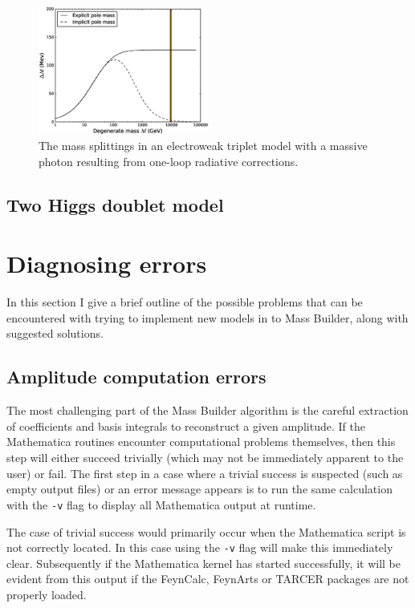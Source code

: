 \begin{figure}
\centering
\includegraphics[width=0.5\textwidth]{mass_splittings.eps}
\caption{The mass splittings in an electroweak triplet model with a massive photon resulting from one-loop radiative corrections.}\label{fig:1_loop}
\end{figure}



\subsection{Two Higgs doublet model}





\section{Diagnosing errors}\label{errors}

In this section I give a brief outline of the possible problems that can be encountered with trying to implement new models in to Mass Builder, along with suggested solutions.

\subsection{Amplitude computation errors}

The most challenging part of the Mass Builder algorithm is the careful extraction of coefficients and basis integrals to reconstruct a given amplitude.  If the Mathematica routines encounter computational problems themselves, then this step will either succeed trivially (which may not be immediately apparent to the user) or fail.  The first step in a case where a trivial success is suspected (such as empty output files) or an error message appears is to run the same calculation with the \lstinline{-v} flag to display all Mathematica output at runtime.

The case of trivial success would primarily occur when the Mathematica script is not correctly located.  In this case using the \lstinline{-v} flag will make this immediately clear.  Subsequently if the Mathematica kernel has started successfully, it will be evident from this output if the FeynCalc, FeynArts or TARCER packages are not properly loaded.

